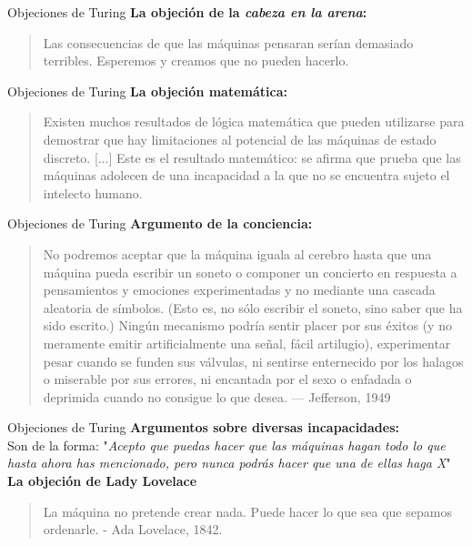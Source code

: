\documentclass{beamer}
\begin{document}
\begin{frame}{Objeciones de Turing}
\textbf{La objeción de la \emph{cabeza en la arena}:}
\begin{quote}\small Las consecuencias de que las máquinas pensaran serían demasiado terribles. Esperemos y creamos que no pueden hacerlo.\end{quote}
\end{frame}

\begin{frame}{Objeciones de Turing}
\textbf{La objeción matemática:}
\begin{quote}\small Existen muchos resultados de lógica matemática que pueden utilizarse para demostrar que hay limitaciones al potencial de las máquinas de estado discreto. [...] Este es el resultado matemático: se afirma que prueba que las máquinas adolecen de una incapacidad a la que no se encuentra sujeto el intelecto humano.\end{quote}
\end{frame}
\begin{frame}{Objeciones de Turing}
\textbf{Argumento de la conciencia:}
\begin{quote}\small No podremos aceptar que la máquina iguala al cerebro hasta que una máquina pueda escribir un soneto o componer un concierto en respuesta a pensamientos y emociones experimentadas y no mediante una cascada aleatoria de símbolos. (Esto es, no sólo escribir el soneto, sino saber que ha sido escrito.) Ningún mecanismo podría sentir placer por sus éxitos (y no meramente emitir artificialmente una señal, fácil artilugio), experimentar pesar cuando se funden sus válvulas, ni sentirse enternecido por los halagos o miserable por sus errores, ni encantada por el sexo o enfadada o deprimida cuando no consigue lo que desea. — Jefferson, 1949\end{quote}

\end{frame}
\begin{frame}{Objeciones de Turing}
\textbf{Argumentos sobre diversas incapacidades:}\\
Son de la forma: "\emph{Acepto que puedas hacer que las máquinas hagan todo lo que hasta ahora has mencionado, pero nunca podrás hacer que una de ellas haga X}"\\
\vspace{8mm}
\textbf{La objeción de Lady Lovelace}
\begin{quote}\small La máquina no pretende crear nada. Puede hacer lo que sea que sepamos ordenarle. - Ada Lovelace, 1842.\end{quote}
\end{frame}
\end{document}
